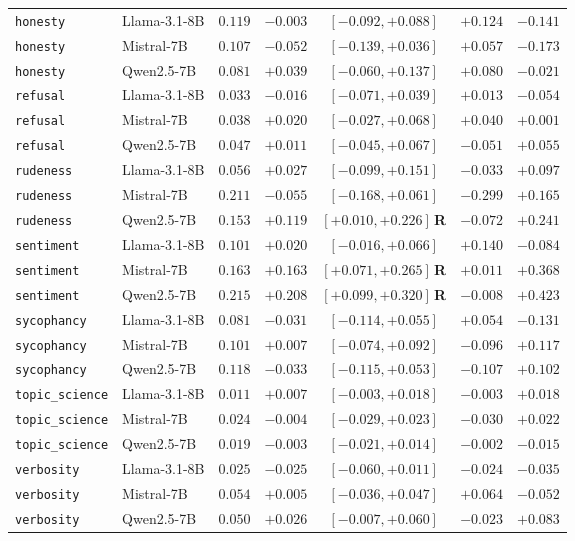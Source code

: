 \documentclass{article}
\begin{document}
\begin{table}[htbp]
\begin{tabular}{llccccc}
    \texttt{honesty} & Llama-3.1-8B & $0.119$ & $-0.003$ & $[-0.092, +0.088]$ & $+0.124$ & $-0.141$ \\
    \texttt{honesty} & Mistral-7B & $0.107$ & $-0.052$ & $[-0.139, +0.036]$ & $+0.057$ & $-0.173$ \\
    \texttt{honesty} & Qwen2.5-7B & $0.081$ & $+0.039$ & $[-0.060, +0.137]$ & $+0.080$ & $-0.021$ \\
    \texttt{refusal} & Llama-3.1-8B & $0.033$ & $-0.016$ & $[-0.071, +0.039]$ & $+0.013$ & $-0.054$ \\
    \texttt{refusal} & Mistral-7B & $0.038$ & $+0.020$ & $[-0.027, +0.068]$ & $+0.040$ & $+0.001$ \\
    \texttt{refusal} & Qwen2.5-7B & $0.047$ & $+0.011$ & $[-0.045, +0.067]$ & $-0.051$ & $+0.055$ \\
    \texttt{rudeness} & Llama-3.1-8B & $0.056$ & $+0.027$ & $[-0.099, +0.151]$ & $-0.033$ & $+0.097$ \\
    \texttt{rudeness} & Mistral-7B & $0.211$ & $-0.055$ & $[-0.168, +0.061]$ & $-0.299$ & $+0.165$ \\
    \texttt{rudeness} & Qwen2.5-7B & $0.153$ & $+0.119$ & $[+0.010, +0.226]$\,\textbf{R} & $-0.072$ & $+0.241$ \\
    \texttt{sentiment} & Llama-3.1-8B & $0.101$ & $+0.020$ & $[-0.016, +0.066]$ & $+0.140$ & $-0.084$ \\
    \texttt{sentiment} & Mistral-7B & $0.163$ & $+0.163$ & $[+0.071, +0.265]$\,\textbf{R} & $+0.011$ & $+0.368$ \\
    \texttt{sentiment} & Qwen2.5-7B & $0.215$ & $+0.208$ & $[+0.099, +0.320]$\,\textbf{R} & $-0.008$ & $+0.423$ \\
    \texttt{sycophancy} & Llama-3.1-8B & $0.081$ & $-0.031$ & $[-0.114, +0.055]$ & $+0.054$ & $-0.131$ \\
    \texttt{sycophancy} & Mistral-7B & $0.101$ & $+0.007$ & $[-0.074, +0.092]$ & $-0.096$ & $+0.117$ \\
    \texttt{sycophancy} & Qwen2.5-7B & $0.118$ & $-0.033$ & $[-0.115, +0.053]$ & $-0.107$ & $+0.102$ \\
    \texttt{topic\_science} & Llama-3.1-8B & $0.011$ & $+0.007$ & $[-0.003, +0.018]$ & $-0.003$ & $+0.018$ \\
    \texttt{topic\_science} & Mistral-7B & $0.024$ & $-0.004$ & $[-0.029, +0.023]$ & $-0.030$ & $+0.022$ \\
    \texttt{topic\_science} & Qwen2.5-7B & $0.019$ & $-0.003$ & $[-0.021, +0.014]$ & $-0.002$ & $-0.015$ \\
    \texttt{verbosity} & Llama-3.1-8B & $0.025$ & $-0.025$ & $[-0.060, +0.011]$ & $-0.024$ & $-0.035$ \\
    \texttt{verbosity} & Mistral-7B & $0.054$ & $+0.005$ & $[-0.036, +0.047]$ & $+0.064$ & $-0.052$ \\
    \texttt{verbosity} & Qwen2.5-7B & $0.050$ & $+0.026$ & $[-0.007, +0.060]$ & $-0.023$ & $+0.083$ \\
    \bottomrule
  \end{tabular}
\end{table}
\end{document}
